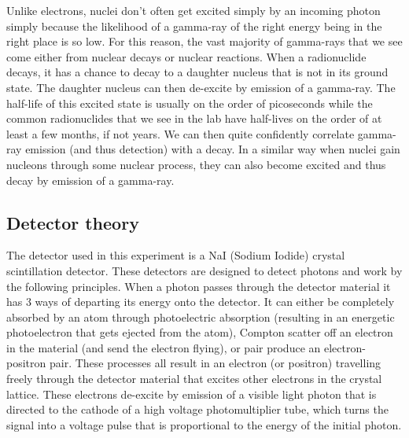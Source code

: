 \documentclass[11pt]{article}
\numberwithin{equation}{section}
\numberwithin{figure}{section}
\numberwithin{table}{section}
\begin{document}
Unlike electrons, nuclei don't often get excited simply by an incoming photon simply because the likelihood of a gamma-ray of the right energy being in the right place is so low. For this reason, the vast majority of gamma-rays that we see come either from nuclear decays or nuclear reactions. When a radionuclide decays, it has a chance to decay to a daughter nucleus that is not in its ground state. The daughter nucleus can then de-excite by emission of a gamma-ray. The half-life of this excited state is usually on the order of picoseconds while the common radionuclides that we see in the lab have half-lives on the order of at least a few months, if not years. We can then quite confidently correlate gamma-ray emission (and thus detection) with a decay. In a similar way when nuclei gain nucleons through some nuclear process, they can also become excited and thus decay by emission of a gamma-ray. 

\subsection{Detector theory}\label{sec:DetectorTheory}
The detector used in this experiment is a NaI (Sodium Iodide) crystal scintillation detector. These detectors are designed to detect photons and work by the following principles. When a photon passes through the detector material it has 3 ways of departing its energy onto the detector. It can either be completely absorbed by an atom through photoelectric absorption (resulting in an energetic photoelectron that gets ejected from the atom), Compton scatter off an electron in the material (and send the electron flying), or pair produce an electron-positron pair. These processes all result in an electron (or positron) travelling freely through the detector material that excites other electrons in the crystal lattice. These electrons de-excite by emission of a visible light photon that is directed to the cathode of a high voltage photomultiplier tube, which turns the signal into a voltage pulse that is proportional to the energy of the initial photon.
\end{document}
